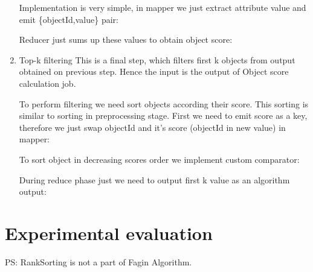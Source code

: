 \documentclass[a4paper]{article}
\begin{document}
\begin{enumerate}
    Implementation is very simple, in mapper we just extract attribute value and emit \{objectId,value\} pair:
    

    Reducer just sums up these values to obtain object score:
    

    \item Top-k filtering
    This is a final step, which filters first k objects from output obtained on previous step.
    Hence the input is the output of Object score calculation job.

    To perform filtering we need sort objects according their score.
    This sorting is similar to sorting in preprocessing stage.
    First we need to emit score as a key, therefore we just swap objectId and it's score (objectId in new value) in mapper:
    

    To sort object in decreasing scores order we implement custom comparator:
    

    During reduce phase just we need to output first k value as an algorithm output:
    
\end{enumerate}

\section{Experimental evaluation}
\label{sec:experiments}

PS: RankSorting is not a part of Fagin Algorithm.
\end{document}
